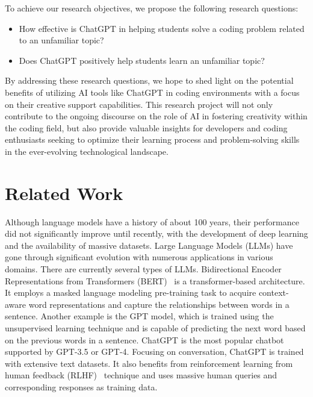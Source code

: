 \documentclass[manuscript,screen,nonacm]{acmart}
\begin{document}
To achieve our research objectives, we propose the following research questions:
\begin{itemize}
\item {How effective is ChatGPT in helping students solve a coding problem related to an unfamiliar topic?}
\item {Does ChatGPT positively help students learn an unfamiliar topic?}
\end{itemize}

By addressing these research questions, we hope to shed light on the potential benefits of utilizing AI tools like ChatGPT in coding environments with a focus on their creative support capabilities. This research project will not only contribute to the ongoing discourse on the role of AI in fostering creativity within the coding field, but also provide valuable insights for developers and coding enthusiasts seeking to optimize their learning process and problem-solving skills in the ever-evolving technological landscape.



\section{Related Work}
Although language models have a history of about 100 years, their performance did not significantly improve until recently, with the development of deep learning and the availability of massive datasets. Large Language Models (LLMs) have gone through significant evolution with numerous applications in various domains. There are currently several types of LLMs. Bidirectional Encoder Representations from Transformers (BERT)~\cite{devlin2018bert} is a transformer-based architecture. It employs a masked language modeling pre-training task to acquire context-aware word representations and capture the relationships between words in a sentence. Another example is the GPT model, which is trained using the unsupervised learning technique and is capable of predicting the next word based on the previous words in a sentence. ChatGPT is the most popular chatbot supported by GPT-3.5 or GPT-4. Focusing on conversation, ChatGPT is trained with extensive text datasets. It also benefits from reinforcement learning from human feedback (RLHF)~\cite{lambert2022illustrating} technique and uses massive human queries and corresponding responses as training data.
\end{document}
